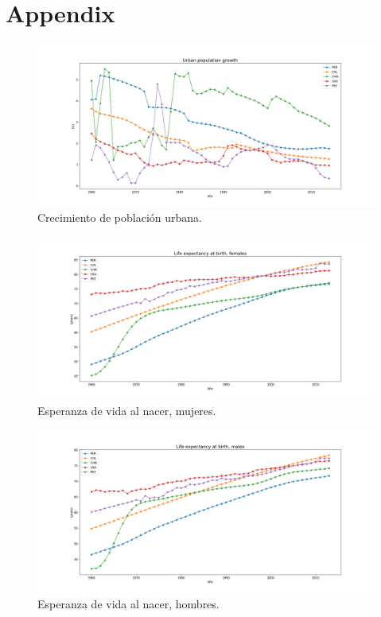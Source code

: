 \documentclass{article}
\begin{document}
\newpage
\section*{Appendix}



\begin{figure}[!h]
	\centering
	\includegraphics[scale=0.38]{images/2.png}
	\caption{Crecimiento de población urbana.}
	\label{fig:1}
\end{figure}

\begin{figure}
	\centering
	\includegraphics[scale=0.38]{images/figure_1.png}
	\caption{Esperanza de vida al nacer, mujeres.}
	\label{fig:2}
\end{figure}

\begin{figure}
	\centering
	\includegraphics[scale=0.38]{images/figure_1-1.png}
	\caption{Esperanza de vida al nacer, hombres.}
	\label{fig:3}
\end{figure}
\end{document}
